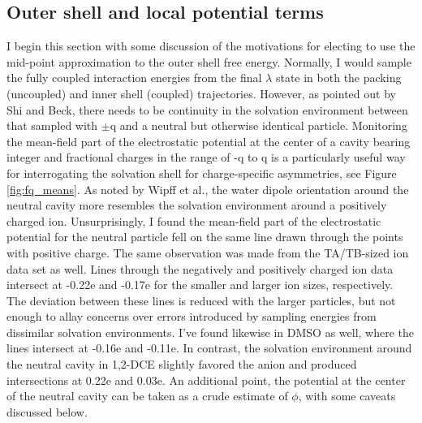 \begin{tatb}
  \subsection{\label{ch6:sec2:level3}Outer shell and local potential terms}
  I begin this section with some discussion of the motivations for electing to use the mid-point approximation to the outer shell free energy. Normally, I would sample
  the fully coupled interaction energies from the final $\lambda$ state in both the packing (uncoupled) and inner shell (coupled) trajectories. However, as pointed out
  by Shi and Beck\cite{shi2013length}, there needs to be continuity in the solvation environment between that sampled with $\pm$q and a neutral but otherwise identical
  particle. Monitoring the mean-field part of the electrostatic potential at the center of a cavity bearing integer and fractional charges in the range of -q to q is a
  particularly useful way for interrogating the solvation shell for charge-specific asymmetries, see Figure \ref{fig:fq_means}. As noted by Wipff et al., the water dipole
  orientation around the
  neutral cavity more resembles the solvation environment around a positively charged ion\cite{wipff1999tatb}. Unsurprisingly, I found the mean-field part of the
  electrostatic potential for the neutral particle fell on the same line drawn through the points with positive charge. The same observation was made from the
  TA\sur{+}/TB\sur{-}-sized ion data set as well. Lines through the negatively and positively charged ion data intersect at -0.22e and -0.17e for the smaller and larger
  ion sizes, respectively. The deviation between these lines is reduced with the larger particles, but not enough to allay concerns over errors introduced by sampling
  energies from dissimilar solvation environments. I've found likewise in DMSO as well, where the lines intersect at -0.16e and -0.11e. In contrast, the solvation
  environment around the neutral cavity in 1,2-DCE slightly favored the anion and produced intersections at 0.22e and 0.03e. An additional point, the potential at the
  center of the neutral cavity can be taken as a crude estimate of $\phi$, with some caveats discussed below.
  

\end{tatb}
